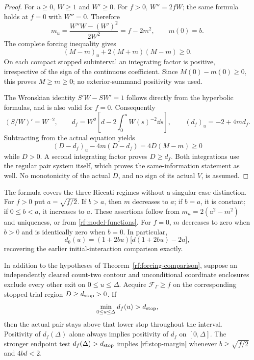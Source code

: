 \begin{proof}
For $u\ge0$, $W\ge1$ and $W'\ge0$. For $f>0$, $W''=2fW$;
the same formula holds at $f=0$ with $W''=0$. Therefore
\[
 m_u=\frac{W''W-(W')^2}{2W^2}=f-2m^2,
 \qquad m(0)=b.
\]
The complete forcing inequality gives
\[
 (M-m)_u+2(M+m)(M-m)\ge0.
\]
On each compact stopped subinterval an integrating factor is positive,
irrespective of the sign of the continuous coefficient. Since
$M(0)-m(0)\ge0$, this proves $M\ge m\ge0$; no exterior-summand
positivity was used.

The Wronskian identity $S'W-SW'=1$ follows directly from the hyperbolic
formulas, and is also valid for $f=0$. Consequently
\[
 (S/W)'=W^{-2},\qquad
 d_f=W^2\left[d-2\int_0^u W(s)^{-2}\dd s\right],\qquad
 (d_f)_u=-2+4m d_f.
\]
Subtracting from the actual equation yields
\[
 (D-d_f)_u-4m(D-d_f)=4D(M-m)\ge0
\]
while $D>0$. A second integrating factor proves $D\ge d_f$.
Both integrations use the regular pair system itself, which proves the
same-information statement as well. No monotonicity of the actual
$D$, and no sign of its actual $V$, is assumed.
\end{proof}

The formula covers the three Riccati regimes without a singular case
distinction. For $f>0$ put $a=\sqrt{f/2}$. If $b>a$, then $m$ decreases
to $a$; if $b=a$, it is constant; if $0\le b<a$, it increases to $a$.
These assertions follow from $m_u=2(a^2-m^2)$ and uniqueness, or from
\eqref{rf:model-functions}. For $f=0$, $m$ decreases to zero when
$b>0$ and is identically zero when $b=0$. In particular,
\begin{equation}
 d_0(u)=(1+2bu)\bigl[d(1+2bu)-2u\bigr],
 \label{rf:zero-forcing-limit}
\end{equation}
recovering the earlier initial-interaction comparison exactly.

\begin{corollary}
\label{rf:forcing-stop}
In addition to the hypotheses of Theorem~\ref{rf:forcing-comparison},
suppose an independently cleared count-two contour and unconditional
coordinate enclosures exclude every other exit on $0\le u\le\Delta$.
Acquire $\mathcal F_\Gamma\ge f$ on the corresponding stopped trial
region $D\ge d_{\rm stop}>0$. If
\begin{equation}
 \min_{0\le u\le\Delta}d_f(u)>d_{\rm stop},
 \label{rf:stop-margin}
\end{equation}
then the actual pair stays above that lower stop throughout the interval.
Positivity of $d_f(\Delta)$ alone always implies positivity of $d_f$
on $[0,\Delta]$. The stronger endpoint test
$d_f(\Delta)>d_{\rm stop}$ implies \eqref{rf:stop-margin} whenever
$b\ge\sqrt{f/2}$ and $4bd<2$.
\end{corollary}

